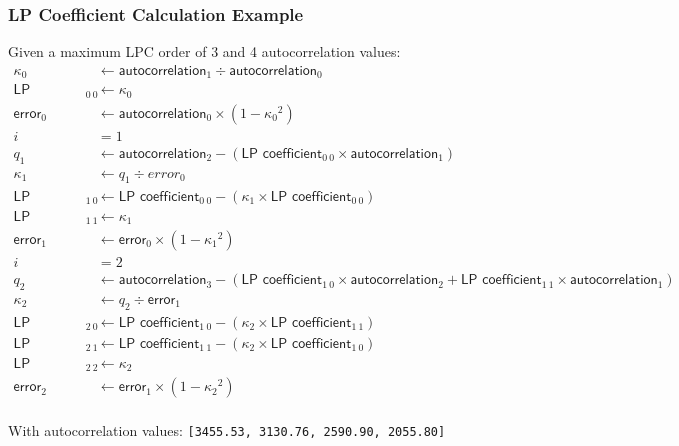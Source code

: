 \clearpage

\subsubsection{LP Coefficient Calculation Example}
Given a maximum LPC order of 3 and 4 autocorrelation values:
{
  \begin{align*}
    \kappa_0 &\leftarrow \textsf{autocorrelation}_1 \div \textsf{autocorrelation}_0 \\
    \textsf{LP coefficient}_{0~0} &\leftarrow \kappa_0 \\
    \textsf{error}_0 &\leftarrow \textsf{autocorrelation}_0 \times (1 - {\kappa_0} ^ 2) \\
    i &= 1 \\
    q_1 &\leftarrow \textsf{autocorrelation}_2 - (\textsf{LP coefficient}_{0~0} \times \textsf{autocorrelation}_{1}) \\
    \kappa_1 &\leftarrow q_1 \div error_0 \\
    \textsf{LP coefficient}_{1~0} &\leftarrow \textsf{LP coefficient}_{0~0} - (\kappa_1 \times \textsf{LP coefficient}_{0~0}) \\
    \textsf{LP coefficient}_{1~1} &\leftarrow \kappa_1 \\
    \textsf{error}_1 &\leftarrow \textsf{error}_0 \times (1 - {\kappa_1} ^ 2) \\
    i &= 2 \\
    q_2 &\leftarrow \textsf{autocorrelation}_3 - (\textsf{LP coefficient}_{1~0} \times \textsf{autocorrelation}_{2} + \textsf{LP coefficient}_{1~1} \times \textsf{autocorrelation}_{1}) \\
    \kappa_2 &\leftarrow q_2 \div \textsf{error}_1 \\
    \textsf{LP coefficient}_{2~0} &\leftarrow \textsf{LP coefficient}_{1~0} - (\kappa_2 \times \textsf{LP coefficient}_{1~1}) \\
    \textsf{LP coefficient}_{2~1} &\leftarrow \textsf{LP coefficient}_{1~1} - (\kappa_2 \times \textsf{LP coefficient}_{1~0}) \\
    \textsf{LP coefficient}_{2~2} &\leftarrow \kappa_2 \\
    \textsf{error}_2 &\leftarrow \textsf{error}_1 \times (1 - {\kappa_2} ^ 2) \\
\end{align*}
}
\par
\noindent
With \textsf{autocorrelation} values: \texttt{[3455.53, 3130.76, 2590.90, 2055.80]}
